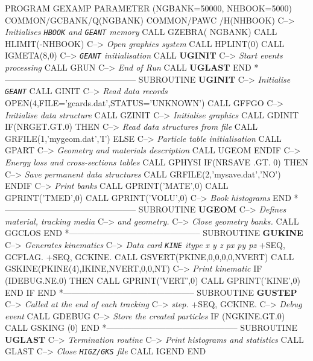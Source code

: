 \begin{multicols}{2}
\footnotesize
\begin{XMP}
      PROGRAM GEXAMP
      PARAMETER (NGBANK=50000, NHBOOK=5000)
      COMMON/GCBANK/Q(NGBANK)
      COMMON/PAWC  /H(NHBOOK)
C--> {\sl Initialises {\tt HBOOK} and {\tt GEANT} memory}
      CALL GZEBRA( NGBANK)
      CALL HLIMIT(-NHBOOK)
C--> {\sl Open graphics system}
      CALL HPLINT(0)
      CALL IGMETA(8,0)
C--> {\sl {\tt GEANT} initialisation}
      CALL {\bf UGINIT}
C--> {\sl Start events processing}
      CALL GRUN
C--> {\sl End of Run}
      CALL {\bf UGLAST}
      END
*-----------------------------------------------
      SUBROUTINE {\bf UGINIT}
C--> {\sl Initialise {\tt GEANT}}
      CALL GINIT
C--> {\sl Read data records}
      OPEN(4,FILE='gcards.dat',STATUS='UNKNOWN')
      CALL GFFGO
C--> {\sl Initialise data structure}
      CALL GZINIT
C--> {\sl Initialise graphics}
      CALL GDINIT
      IF(NRGET.GT.0) THEN
C--> {\sl Read data structures from file}
         CALL GRFILE(1,'mygeom.dat','I')
      ELSE
C--> {\sl Particle table initialisation}
         CALL GPART
C--> {\sl Geometry and materials description}
         CALL UGEOM
      ENDIF
C--> {\sl Energy loss and cross-sections tables}
      CALL GPHYSI
      IF(NRSAVE .GT. 0) THEN
C--> {\sl Save permanent data structures} 
         CALL GRFILE(2,'mysave.dat','NO')
      ENDIF
C--> {\sl Print banks}
      CALL GPRINT('MATE',0)
      CALL GPRINT('TMED',0)
      CALL GPRINT('VOLU',0)
C--> {\sl Book histograms} 
      END
*-----------------------------------------------
      SUBROUTINE {\bf UGEOM}
C--> {\sl Defines material, tracking media }
C--> {\sl and geometry.}
C--> {\sl Close geometry banks.}
      CALL GGCLOS
      END
*-----------------------------------------------
      SUBROUTINE {\bf GUKINE}
C--> {\sl Generates kinematics}
C--> {\sl Data card {\tt KINE} itype x y z px py pz}
+SEQ, GCFLAG.
+SEQ, GCKINE.
      CALL GSVERT(PKINE,0,0,0,0,NVERT)
      CALL GSKINE(PKINE(4),IKINE,NVERT,0,0,NT)
C--> {\sl Print kinematic}
      IF (IDEBUG.NE.0) THEN
         CALL GPRINT('VERT',0)
         CALL GPRINT('KINE',0)
      END IF
      END
*-----------------------------------------------
      SUBROUTINE {\bf GUSTEP}
C--> {\sl Called at the end of each tracking }
C--> {\sl step.}
+SEQ, GCKINE.
C--> {\sl Debug event}
      CALL GDEBUG
C--> {\sl Store the created particles} 
      IF (NGKINE.GT.0) CALL GSKING (0)
      END
*-----------------------------------------------
      SUBROUTINE {\bf UGLAST}
C--> {\sl Termination routine} 
C--> {\sl Print histograms and statistics}
      CALL GLAST
C--> {\sl Close {\tt HIGZ/GKS} file}
      CALL IGEND
      END
\end{XMP}
\end{multicols}

